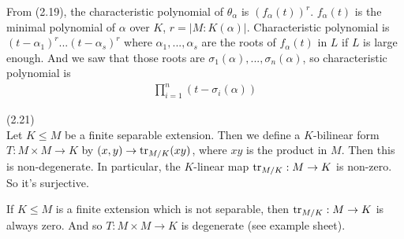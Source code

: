 \documentclass[a4paper]{article}
\begin{document}
From (2.19), the characteristic polynomial of $\theta_\alpha$ is $(f_\alpha(t))^r$. $f_\alpha(t)$ is the minimal polynomial of $\alpha$ over $K$, $r=|M:K(\alpha)|$. Characteristic polynomial is $(t-\alpha_1)^r ... (t-\alpha_s)^r$ where $\alpha_1,...,\alpha_s$ are the roots of $f_\alpha(t)$ in $L$ if $L$ is large enough. And we saw that those roots are $\sigma_1(\alpha),...,\sigma_n(\alpha)$, so characteristic polynomial is
\begin{equation*}
\begin{aligned}
\prod_{i=1}^n (t-\sigma_i(\alpha))
\end{aligned}
\end{equation*}

\begin{thm} (2.21)\\
Let $K \leq M$ be a finite separable extension. Then we define a $K$-bilinear form $T:M \times M \to K$ by $(x,y) \to \operatorname{tr}_{M/K} (xy)$, where $xy$ is the product in $M$. Then this is non-degenerate. In particular, the $K$-linear map $\operatorname{tr}_{M/K}: M \to K$ is non-zero. So it's surjective.
\end{thm}

\begin{rem}
If $K \leq M$ is a finite extension which is not separable, then $\operatorname{tr}_{M/K}:M \to K$ is always zero. And so $T:M \times M \to K$ is degenerate (see example sheet).
\end{rem}
\end{document}
